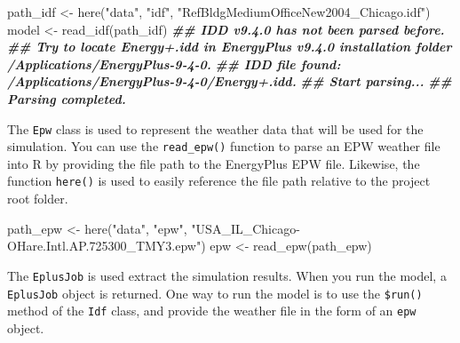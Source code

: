 \documentclass[
]{book}
\newenvironment{Shaded}{\begin{snugshade}}{\end{snugshade}}
\newcommand{\AttributeTok}[1]{\textcolor[rgb]{0.77,0.63,0.00}{#1}}
\newcommand{\DocumentationTok}[1]{\textcolor[rgb]{0.56,0.35,0.01}{\textbf{\textit{#1}}}}
\newcommand{\FunctionTok}[1]{\textcolor[rgb]{0.00,0.00,0.00}{#1}}
\newcommand{\NormalTok}[1]{#1}
\newcommand{\OtherTok}[1]{\textcolor[rgb]{0.56,0.35,0.01}{#1}}
\newcommand{\SpecialCharTok}[1]{\textcolor[rgb]{0.00,0.00,0.00}{#1}}
\newcommand{\StringTok}[1]{\textcolor[rgb]{0.31,0.60,0.02}{#1}}
\begin{document}
\begin{Shaded}
\begin{Highlighting}[]
\NormalTok{path\_idf }\OtherTok{\textless{}{-}} \FunctionTok{here}\NormalTok{(}\StringTok{"data"}\NormalTok{, }\StringTok{"idf"}\NormalTok{, }\StringTok{"RefBldgMediumOfficeNew2004\_Chicago.idf"}\NormalTok{)}
\NormalTok{model }\OtherTok{\textless{}{-}} \FunctionTok{read\_idf}\NormalTok{(path\_idf)}
\DocumentationTok{\#\# IDD v9.4.0 has not been parsed before.}
\DocumentationTok{\#\# Try to locate \textquotesingle{}Energy+.idd\textquotesingle{} in EnergyPlus v9.4.0 installation folder \textquotesingle{}/Applications/EnergyPlus{-}9{-}4{-}0\textquotesingle{}.}
\DocumentationTok{\#\# IDD file found: \textquotesingle{}/Applications/EnergyPlus{-}9{-}4{-}0/Energy+.idd\textquotesingle{}.}
\DocumentationTok{\#\# Start parsing...}
\DocumentationTok{\#\# Parsing completed.}
\end{Highlighting}
\end{Shaded}

The \texttt{Epw} class is used to represent the weather data that will be used for the simulation. You can use the \texttt{read\_epw()} function to parse an EPW weather file into R by providing the file path to the EnergyPlus EPW file. Likewise, the function \texttt{here()} is used to easily reference the file path relative to the project root folder.

\begin{Shaded}
\begin{Highlighting}[]
\NormalTok{path\_epw }\OtherTok{\textless{}{-}} \FunctionTok{here}\NormalTok{(}\StringTok{"data"}\NormalTok{, }\StringTok{"epw"}\NormalTok{, }\StringTok{"USA\_IL\_Chicago{-}OHare.Intl.AP.725300\_TMY3.epw"}\NormalTok{)}
\NormalTok{epw }\OtherTok{\textless{}{-}} \FunctionTok{read\_epw}\NormalTok{(path\_epw)}
\end{Highlighting}
\end{Shaded}

The \texttt{EplusJob} is used extract the simulation results. When you run the model, a \texttt{EplusJob} object is returned. One way to run the model is to use the \texttt{\$run()} method of the \texttt{Idf} class, and provide the weather file in the form of an \texttt{epw} object.

\begin{Shaded}
\end{Shaded}
\end{document}
